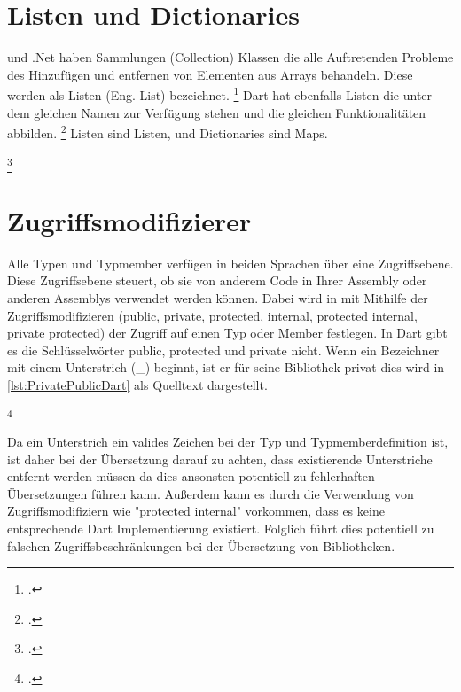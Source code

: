 \section{Listen und Dictionaries}
\Csharp und .Net haben Sammlungen (Collection) Klassen die alle Auftretenden Probleme des Hinzufügen und entfernen von Elementen aus Arrays behandeln.  Diese werden als Listen (Eng. List) bezeichnet. \footcite[Vgl.][S. 413]{Stellman2021} Dart hat ebenfalls Listen die unter dem gleichen Namen zur Verfügung stehen und die gleichen Funktionalitäten abbilden. \footcite[Vgl.][S. 12f ]{Meiller2020}
Listen sind Listen, und Dictionaries sind Maps.


\begin{minipage}{\linewidth}

\end{minipage}
\footcitetext[In Anlehnung an ][Abgerufen am \today]{Pedley2019}



\section{Zugriffsmodifizierer}

Alle Typen und Typmember verfügen in beiden Sprachen über eine Zugriffsebene.  Diese Zugriffsebene steuert, ob sie von anderem Code in Ihrer Assembly oder anderen Assemblys verwendet werden können.  Dabei wird in \Csharp mit Mithilfe der Zugriffsmodifizieren (public,  private,  protected,  internal,  protected internal,  private protected) der Zugriff auf einen Typ oder Member festlegen.  In Dart gibt es die Schlüsselwörter public,  protected und private nicht. Wenn ein Bezeichner mit einem Unterstrich (\_) beginnt, ist er für seine Bibliothek privat dies wird in \ref{lst:PrivatePublicDart} als Quelltext dargestellt. 

\begin{minipage}{\linewidth}

\end{minipage}
\footcitetext[In Anlehnung an ][Abgerufen am \today]{Pedley2019}

Da ein Unterstrich ein valides Zeichen bei der Typ und Typmemberdefinition ist, ist daher bei der Übersetzung darauf zu achten,  dass existierende Unterstriche entfernt werden müssen da dies ansonsten potentiell zu fehlerhaften Übersetzungen führen kann.  Außerdem kann es durch die Verwendung von Zugriffsmodifiziern wie "protected internal" vorkommen, dass es keine entsprechende Dart Implementierung existiert.  Folglich führt dies potentiell zu falschen Zugriffsbeschränkungen bei der Übersetzung von Bibliotheken. 

